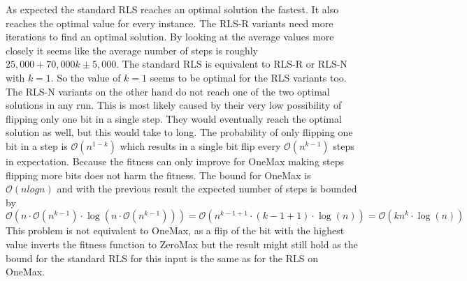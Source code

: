 As expected the standard RLS reaches an optimal solution the fastest.
It also reaches the optimal value for every instance.
The RLS-R variants need more iterations to find an optimal solution.
By looking at the average values more closely it seems like the average number of steps is roughly $25,000 + 70,000k \pm 5,000$.
The standard RLS is equivalent to RLS-R or RLS-N with $k=1$.
So the value of $k=1$ seems to be optimal for the RLS variants too.
The RLS-N variants on the other hand do not reach one of the two optimal solutions in any run.
This is most likely caused by their very low possibility of flipping only one bit in a single step.
They would eventually reach the optimal solution as well, but this would take to long.
The probability of only flipping one bit in a step is $\mathcal{O}(n^{1-k})$ which results in a single bit flip every $\mathcal{O}(n^{k-1})$ steps in expectation.
Because the fitness can only improve for OneMax making steps flipping more bits does not harm the fitness.
The bound for OneMax is $\mathcal{O}(nlogn)$ and with the previous result the expected number of steps is bounded by
$\mathcal{O}(n\cdot\mathcal{O}(n^{k-1})\cdot \log(n\cdot\mathcal{O}(n^{k-1}))) 
=\mathcal{O}(n^{k-1+1}\cdot (k-1+1)\cdot\log(n))
=\mathcal{O}(kn^{k}\cdot\log(n))$
This problem is not equivalent to OneMax, as a flip of the bit with the highest value inverts the fitness function to ZeroMax but the result might still hold as the bound for the standard RLS for this input is the same as for the RLS on OneMax.